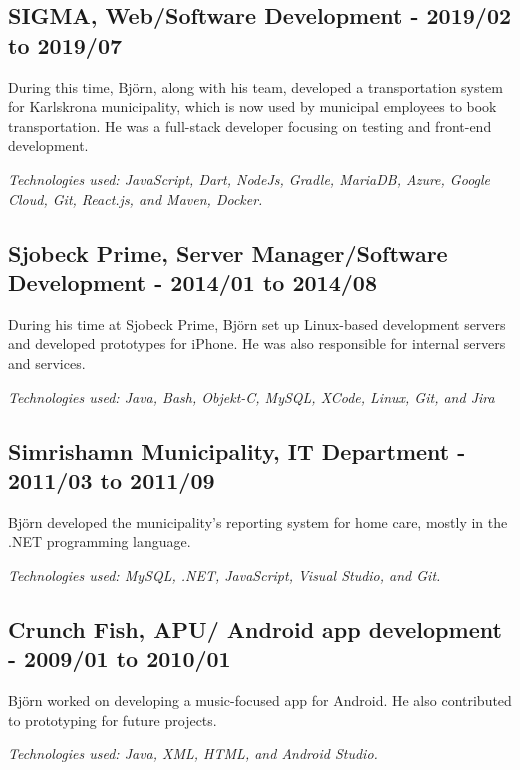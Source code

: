 \documentclass{article}
\begin{document}
\begin{minipage}[t]{0.7\textwidth}
	\vspace{15pt} %
	\subsection*{\textcolor{colorTitelErfarenhet}{SIGMA, Web/Software Development - 2019/02 to 2019/07}}
	During this time, Björn, along with his team, developed a transportation system for Karlskrona municipality, which is now used by municipal employees to book transportation. He was a full-stack developer focusing on testing and front-end development.
	
	\vspace{5pt}\textit{Technologies used: JavaScript, Dart, NodeJs, Gradle, MariaDB, Azure, Google Cloud, Git, React.js, and Maven, Docker.} 
	
	
	\vspace{15pt} %
	\subsection*{\textcolor{colorTitelErfarenhet}{Sjobeck Prime, Server Manager/Software Development - 2014/01 to 2014/08}}
	During his time at Sjobeck Prime, Björn set up Linux-based development servers and developed prototypes for iPhone. He was also responsible for internal servers and services.
	
	\vspace{5pt}\textit{Technologies used: Java, Bash, Objekt-C, MySQL, XCode, Linux, Git, and Jira} 
	
	
	\vspace{15pt} %
	\subsection*{\textcolor{colorTitelErfarenhet}{Simrishamn Municipality, IT Department - 2011/03 to 2011/09}}
	Björn developed the municipality's reporting system for home care, mostly in the .NET programming language.
	
	\vspace{5pt}\textit{Technologies used: MySQL, .NET, JavaScript, Visual Studio, and Git.}
	
	
	\vspace{15pt} %
	\subsection*{\textcolor{colorTitelErfarenhet}{Crunch Fish, APU/ Android app development - 2009/01 to 2010/01}}
	Björn worked on developing a music-focused app for Android. He also contributed to prototyping for future projects.
	
	\vspace{5pt}\textit{Technologies used: Java, XML, HTML, and Android Studio.}
	
\end{minipage}%
\vspace{40pt} %
\end{document}
